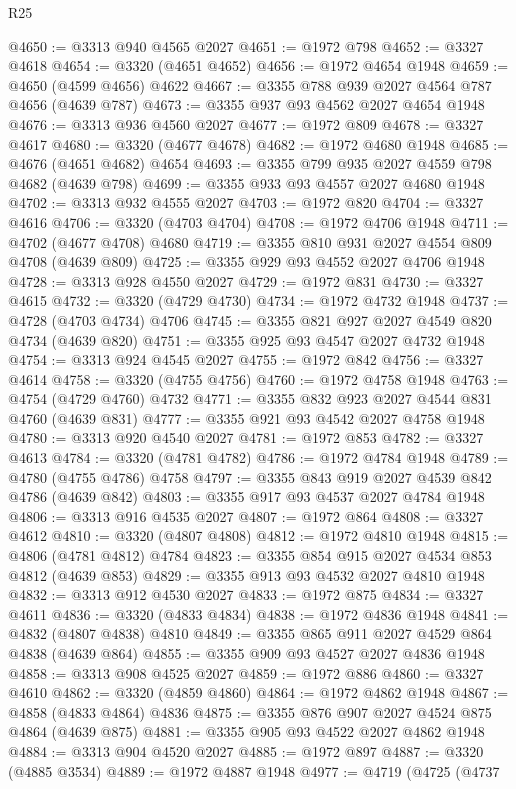 \begin{lexlean}{R25}
\begin{coremodule}
@4650 := @3313 @940 @4565 @2027
@4651 := @1972 @798
@4652 := @3327 @4618
@4654 := @3320 (@4651 @4652)
@4656 := @1972 @4654 @1948
@4659 := @4650 (@4599 @4656) @4622
@4667 := @3355 @788 @939 @2027 @4564 @787 @4656 (@4639 @787)
@4673 := @3355 @937 @93 @4562 @2027 @4654 @1948
@4676 := @3313 @936 @4560 @2027
@4677 := @1972 @809
@4678 := @3327 @4617
@4680 := @3320 (@4677 @4678)
@4682 := @1972 @4680 @1948
@4685 := @4676 (@4651 @4682) @4654
@4693 := @3355 @799 @935 @2027 @4559 @798 @4682 (@4639 @798)
@4699 := @3355 @933 @93 @4557 @2027 @4680 @1948
@4702 := @3313 @932 @4555 @2027
@4703 := @1972 @820
@4704 := @3327 @4616
@4706 := @3320 (@4703 @4704)
@4708 := @1972 @4706 @1948
@4711 := @4702 (@4677 @4708) @4680
@4719 := @3355 @810 @931 @2027 @4554 @809 @4708 (@4639 @809)
@4725 := @3355 @929 @93 @4552 @2027 @4706 @1948
@4728 := @3313 @928 @4550 @2027
@4729 := @1972 @831
@4730 := @3327 @4615
@4732 := @3320 (@4729 @4730)
@4734 := @1972 @4732 @1948
@4737 := @4728 (@4703 @4734) @4706
@4745 := @3355 @821 @927 @2027 @4549 @820 @4734 (@4639 @820)
@4751 := @3355 @925 @93 @4547 @2027 @4732 @1948
@4754 := @3313 @924 @4545 @2027
@4755 := @1972 @842
@4756 := @3327 @4614
@4758 := @3320 (@4755 @4756)
@4760 := @1972 @4758 @1948
@4763 := @4754 (@4729 @4760) @4732
@4771 := @3355 @832 @923 @2027 @4544 @831 @4760 (@4639 @831)
@4777 := @3355 @921 @93 @4542 @2027 @4758 @1948
@4780 := @3313 @920 @4540 @2027
@4781 := @1972 @853
@4782 := @3327 @4613
@4784 := @3320 (@4781 @4782)
@4786 := @1972 @4784 @1948
@4789 := @4780 (@4755 @4786) @4758
@4797 := @3355 @843 @919 @2027 @4539 @842 @4786 (@4639 @842)
@4803 := @3355 @917 @93 @4537 @2027 @4784 @1948
@4806 := @3313 @916 @4535 @2027
@4807 := @1972 @864
@4808 := @3327 @4612
@4810 := @3320 (@4807 @4808)
@4812 := @1972 @4810 @1948
@4815 := @4806 (@4781 @4812) @4784
@4823 := @3355 @854 @915 @2027 @4534 @853 @4812 (@4639 @853)
@4829 := @3355 @913 @93 @4532 @2027 @4810 @1948
@4832 := @3313 @912 @4530 @2027
@4833 := @1972 @875
@4834 := @3327 @4611
@4836 := @3320 (@4833 @4834)
@4838 := @1972 @4836 @1948
@4841 := @4832 (@4807 @4838) @4810
@4849 := @3355 @865 @911 @2027 @4529 @864 @4838 (@4639 @864)
@4855 := @3355 @909 @93 @4527 @2027 @4836 @1948
@4858 := @3313 @908 @4525 @2027
@4859 := @1972 @886
@4860 := @3327 @4610
@4862 := @3320 (@4859 @4860)
@4864 := @1972 @4862 @1948
@4867 := @4858 (@4833 @4864) @4836
@4875 := @3355 @876 @907 @2027 @4524 @875 @4864 (@4639 @875)
@4881 := @3355 @905 @93 @4522 @2027 @4862 @1948
@4884 := @3313 @904 @4520 @2027
@4885 := @1972 @897
@4887 := @3320 (@4885 @3534)
@4889 := @1972 @4887 @1948
@4977 := @4719
    (@4725
      (@4737

\end{coremodule}
\end{lexlean}
